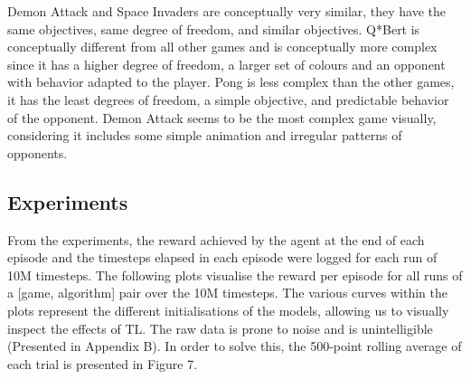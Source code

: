 Demon Attack and Space Invaders are conceptually very similar, they have the same objectives, same degree of freedom, and similar objectives. 
Q*Bert is conceptually different from all other games and is conceptually more complex since it has a higher degree of freedom, a larger set of colours and an opponent with behavior adapted to the player. Pong is less complex than the other games, it has the least degrees of freedom, a simple objective, and predictable behavior of the opponent. 
Demon Attack seems to be the most complex game visually, considering it includes some simple animation and irregular patterns of opponents.

\subsection*{Experiments}
From the experiments, the reward achieved by the agent at the end of each episode and the timesteps elapsed in each episode were logged for each run of 10M timesteps. The following plots visualise the reward per episode for all runs of a [game, algorithm] pair over the 10M timesteps. The various curves within the plots represent the different initialisations of the models, allowing us to visually inspect the effects of TL. The raw data is prone to noise and is unintelligible (Presented in Appendix B). In order to solve this, the 500-point rolling average of each trial is presented in Figure 7.

